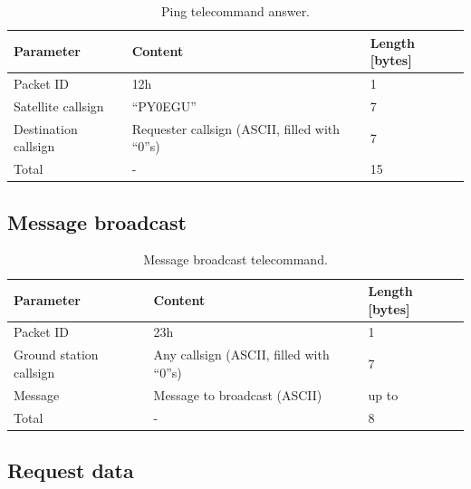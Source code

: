 \begin{table}[!h]
    \centering
    \begin{tabular}{lll}
        \toprule[1.5pt]
        \textbf{Parameter}      & \textbf{Content}                               & \textbf{Length [bytes]} \\
        \midrule
        Packet ID               & 12h                                            & 1 \\
        Satellite callsign      & ``PY0EGU''                                     & 7 \\
        Destination callsign    & Requester callsign (ASCII, filled with ``0''s) & 7 \\
        \midrule
        Total                   & -                                              & 15 \\
        \bottomrule[1.5pt]
    \end{tabular}
    \caption{Ping telecommand answer.}
    \label{tab:ping-tc-ans}
\end{table}

\subsection{Message broadcast}

\begin{table}[!h]
    \centering
    \begin{tabular}{lll}
        \toprule[1.5pt]
        \textbf{Parameter}      & \textbf{Content}                         & \textbf{Length [bytes]} \\
        \midrule
        Packet ID               & 23h                                      & 1 \\
        Ground station callsign & Any callsign (ASCII, filled with ``0''s) & 7 \\
        Message                 & Message to broadcast (ASCII)             & up to  \\
        \midrule
        Total                   & -                                        & 8 \\
        \bottomrule[1.5pt]
    \end{tabular}
    \caption{Message broadcast telecommand.}
    \label{tab:msg-broadcast-tc}
\end{table}

\subsection{Request data}

